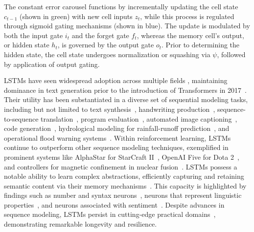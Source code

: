 The constant error carousel functions by incrementally updating the cell state $c_{t-1}$ (shown in green) with new cell inputs $z_t$, while this process is regulated through sigmoid gating mechanisms (shown in blue). The update is modulated by both the input gate $i_t$ and the forget gate $f_t$, whereas the memory cell's output, or hidden state $h_t$, is governed by the output gate $o_t$. Prior to determining the hidden state, the cell state undergoes normalization or squashing via $\psi$, followed by application of output gating.

LSTMs have seen widespread adoption across multiple fields \citep{Hochreiter:01,Hochreiter:07,Schmidhuber:15}, maintaining dominance in text generation prior to the introduction of Transformers in 2017~\citep{Vaswani:17}. Their utility has been substantiated in a diverse set of sequential modeling tasks, including but not limited to text synthesis~\citep{Graves:13,Karpathy:15blog}, handwriting production~\citep{Graves:13}, sequence-to-sequence translation~\citep{Sutskever:14nips}, program evaluation~\citep{Zaremba:14arxiv}, automated image captioning~\citep{Karpathy:15,Hossain:19}, code generation~\citep{Karpathy:15blog}, hydrological modeling for rainfall-runoff prediction~\citep{Kratzert:18,Kratzert:19}, and operational flood warning systems~\citep{Nearing:24}. Within reinforcement learning, LSTMs continue to outperform other sequence modeling techniques, exemplified in prominent systems like AlphaStar for StarCraft II~\citep{Vinyals:17short}, OpenAI Five for Dota 2~\citep{OpenAI:19}, and controllers for magnetic confinement in nuclear fusion~\citep{Degrave:22short}. LSTMs possess a notable ability to learn complex abstractions, efficiently capturing and retaining semantic content via their memory mechanisms~\citep{Karpathy:15blog}. This capacity is highlighted by findings such as number and syntax neurons~\citep{Lakretz:19}, neurons that represent linguistic properties~\citep{Bau:19}, and neurons associated with sentiment~\citep{Radford:17arxiv}. Despite advances in sequence modeling, LSTMs persist in cutting-edge practical domains~\citep{Degrave:22short,Nearing:24}, demonstrating remarkable longevity and resilience.

